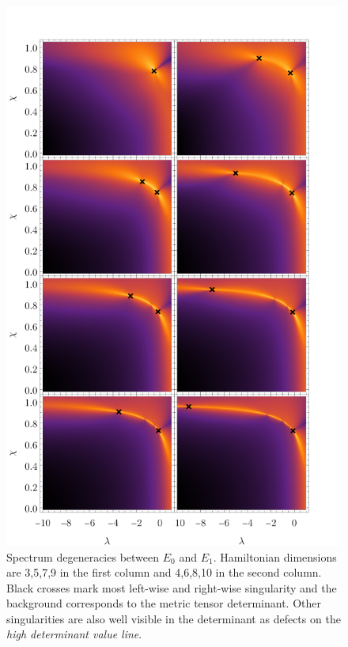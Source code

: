 \begin{figure}[h]
    \centering
    \includegraphics[scale=1.3]{../img/singularitiesPlots.pdf}
    \caption{Spectrum degeneracies between $E_0$ and $E_1$. Hamiltonian dimensions are 3,5,7,9 in the first column and 4,6,8,10 in the second column. Black crosses mark most left-wise and right-wise singularity and the background corresponds to the metric tensor determinant. Other singularities are also well visible in the determinant as defects on the \emph{high determinant value line}.}
    \label{fig:singularities3to10}    
\end{figure}









